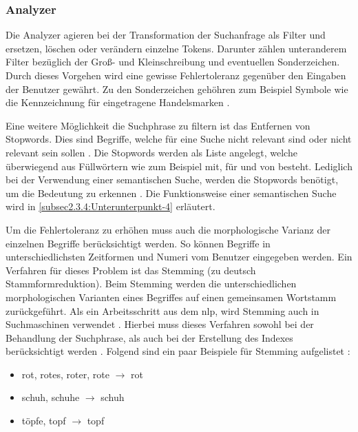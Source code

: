 \subsubsection{Analyzer}

Die Analyzer agieren bei der Transformation der Suchanfrage als Filter und ersetzen, löschen oder verändern einzelne Tokens. Darunter zählen unteranderem Filter bezüglich der Groß- und Kleinschreibung und eventuellen Sonderzeichen. Durch dieses Vorgehen wird eine gewisse Fehlertoleranz gegenüber den Eingaben der Benutzer gewährt. Zu den Sonderzeichen gehöhren zum Beispiel Symbole wie die Kennzeichnung für eingetragene Handelsmarken \glqq \textregistered\grqq{}.

Eine weitere Möglichkeit die Suchphrase zu filtern ist das Entfernen von Stopwords. Dies sind Begriffe, welche für eine Suche nicht relevant sind oder nicht relevant sein sollen \cite{SebastianRuss.2017}. Die Stopwords werden als Liste angelegt, welche überwiegend aus Füllwörtern wie zum Beispiel \glqq mit\grqq{}, \glqq für\grqq{} und \glqq von\grqq{} besteht. Lediglich bei der Verwendung einer semantischen Suche, werden die Stopwords benötigt, um die Bedeutung zu erkennen \cite{SebastianRuss.2017}. Die Funktionsweise einer semantischen Suche wird in \autoref{subsec2.3.4:Unterunterpunkt-4} erläutert.

Um die Fehlertoleranz zu erhöhen muss auch die morphologische Varianz der einzelnen Begriffe berücksichtigt werden. So können Begriffe in unterschiedlichsten Zeitformen und Numeri vom Benutzer eingegeben werden. Ein Verfahren für dieses Problem ist das \glqq Stemming\grqq{} (zu deutsch Stammformreduktion). Beim Stemming werden die unterschiedlichen morphologischen Varianten eines Begriffes auf einen gemeinsamen Wortstamm zurückgeführt. Als ein Arbeitsschritt aus dem \gls{nlp}, wird Stemming auch in Suchmaschinen verwendet \cite{StefanLuber.2020}. Hierbei muss dieses Verfahren sowohl bei der Behandlung der Suchphrase, als auch bei der Erstellung des Indexes berücksichtigt werden \cite{SebastianRuss.2017}. Folgend sind ein paar Beispiele für Stemming aufgelistet \cite{SebastianRuss.2017}:

\begin{itemize}
    \item rot, rotes, roter, rote $\rightarrow$ rot
    \item schuh, schuhe $\rightarrow$ schuh
    \item töpfe, topf $\rightarrow$ topf
\end{itemize}

